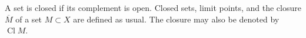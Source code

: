 A set is closed if its complement is open. Closed sets, limit points, and the closure $\overline{M}$ of a set $M \subset X$ are defined as usual. The closure may also be denoted by $\operatorname{Cl} M$.

